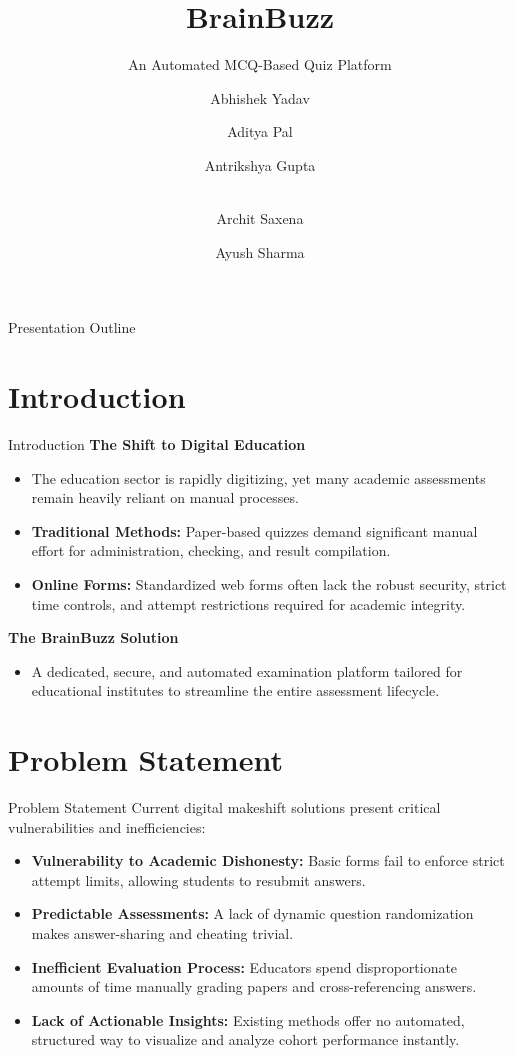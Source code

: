 \documentclass[aspectratio=169, 11pt]{beamer}
\title[BrainBuzz: MCQ Platform]{BrainBuzz}
\subtitle{An Automated MCQ-Based Quiz Platform}
\author[]{
    Abhishek Yadav \and Aditya Pal \and Antrikshya Gupta \and \\
    Archit Saxena \and Ayush Sharma
}
\institute[]{
    Branch: CSE-R (B.Tech Sem 4) \\
    Subject Code: ICS-454 (Mini Project)
}
\date{} %
\begin{document}
\begin{frame}
    \titlepage
\end{frame}

\begin{frame}{Presentation Outline}
    \tableofcontents[hideallsubsections]
\end{frame}

\section{Introduction}
\begin{frame}{Introduction}
    \textbf{The Shift to Digital Education}
    \begin{itemize}
        \item The education sector is rapidly digitizing, yet many academic assessments remain heavily reliant on manual processes.
        \item \textbf{Traditional Methods:} Paper-based quizzes demand significant manual effort for administration, checking, and result compilation.
        \item \textbf{Online Forms:} Standardized web forms often lack the robust security, strict time controls, and attempt restrictions required for academic integrity.
    \end{itemize}
    \vspace{0.5cm}
    \textbf{The BrainBuzz Solution}
    \begin{itemize}
        \item A dedicated, secure, and automated examination platform tailored for educational institutes to streamline the entire assessment lifecycle.
    \end{itemize}
\end{frame}

\section{Problem Statement}
\begin{frame}{Problem Statement}
    Current digital makeshift solutions present critical vulnerabilities and inefficiencies:
    \vspace{0.3cm}
    \begin{itemize}
        \item \textbf{Vulnerability to Academic Dishonesty:} Basic forms fail to enforce strict attempt limits, allowing students to resubmit answers.
        \item \textbf{Predictable Assessments:} A lack of dynamic question randomization makes answer-sharing and cheating trivial.
        \item \textbf{Inefficient Evaluation Process:} Educators spend disproportionate amounts of time manually grading papers and cross-referencing answers.
        \item \textbf{Lack of Actionable Insights:} Existing methods offer no automated, structured way to visualize and analyze cohort performance instantly.
    \end{itemize}
\end{frame}
\end{document}
